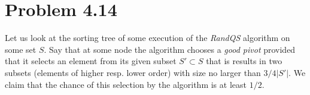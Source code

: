 \section*{Problem 4.14}

Let us look at the sorting tree of some execution of the \emph{RandQS} algorithm on some set $S$.
Say that at some node the algorithm chooses a \emph{good pivot} provided that it selects an element from its given subset $S' \subset S$ that is results in two subsets (elements of higher resp. lower order) with size no larger than $3/4 |S'|$.
We claim that the chance of this selection by the algorithm is at least $1/2$.

